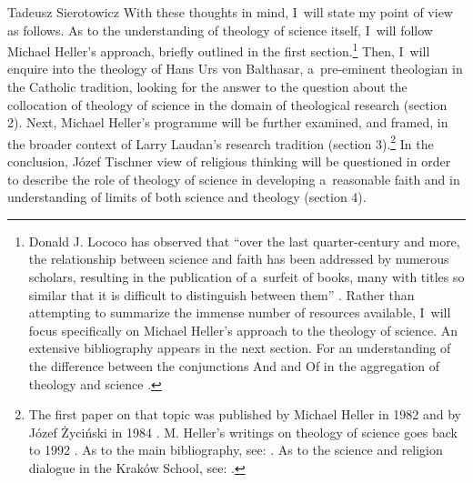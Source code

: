 \begin{artengenv}{Tadeusz Sierotowicz}
With these thoughts in mind, I~will state my point of view as follows. As to the understanding of theology of science itself, I~will follow Michael Heller's approach, briefly outlined in the first section.\footnote{Donald J. Lococo has observed that ``over the last quarter-century and more, the relationship between science and faith has been addressed by numerous scholars, resulting in the publication of a~surfeit of books, many with titles so similar that it is difficult to distinguish between them'' 
\parencite[][p.10]{lococo_life_2021}. %
 Rather than attempting to summarize the immense number of resources available, I~will focus specifically on Michael Heller's approach to the theology of science. An extensive bibliography appears in the next section. For an understanding of the difference between the conjunctions And and Of in the aggregation of theology and science 
\parencites[see][pp.1–4]{tyson_christian_2022}[for other programmes of theology of science see, for example][]{lococo_towards_2002}[][]{lococo_life_2021}[][]{rodzen_teologia_2021}[][]{tyson_christian_2022}[][]{wilkinson_after_2022}.%
} Then, I~will enquire into the theology of Hans Urs von Balthasar, a~pre-eminent theologian in the Catholic tradition, looking for the answer to the question about the collocation of theology of science in the domain of theological research (section 2). Next, Michael Heller's programme will be further examined, and framed, in the broader context of Larry Laudan's research tradition (section 3).\footnote{The first paper on that topic was published by Michael Heller in 1982 and by Józef Życiński in 1984 
\parencites[][]{heller_stworzenie_1982}[][]{zycinski_w_1984}[see][]{polak_teologia_2015}[][]{rodzen_teologia_2021}. %
 M. Heller's writings on theology of science goes back to 1992 
\parencite[for an overview see][pp.759–760]{oleksowicz_we_2020}. %
 As to the main bibliography, see: 
\parencites[][]{heller_new_1996}[][]{maczka_wstep_2015}[][]{macek_teologia_2014}[][]{maczka_teologia_2015}[][]{maziarka_w_2016}[][]{polak_teologia_2016}[][]{oleksowicz_we_2020}[][]{rodzen_teologia_2021}. %
 As to the science and religion dialogue in the Kraków School, see: 
\parencites[][]{brozek_science_2015}[][]{obolevitch_relationship_2015}[][]{polak_science-religion_2021}[][]{polak_theory_2023}.%
} In the conclusion, Józef Tischner view of religious thinking will be questioned in order to describe the role of theology of science in developing a~reasonable faith and in understanding of limits of both science and theology (section 4).




\end{artengenv}
